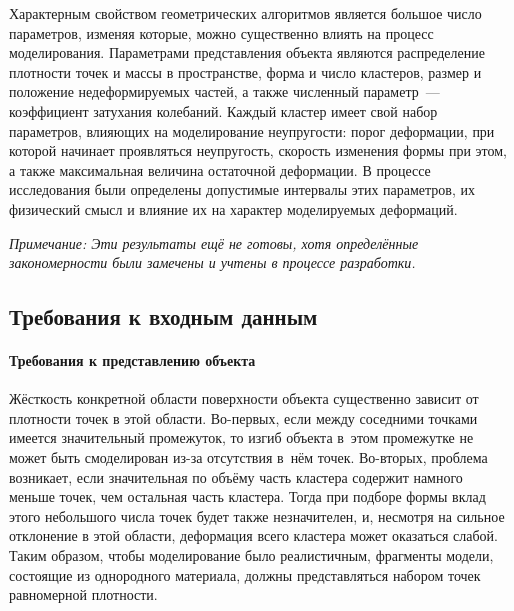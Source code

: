 \documentclass[a4paper, 14pt, titlepage]{extarticle}
\newcommand{\note}[1]{\textit{Примечание: #1}}
\begin{document}
      Характерным свойством геометрических алгоритмов является большое число параметров, изменяя
      которые, можно существенно влиять на процесс моделирования.
      Параметрами представления объекта являются распределение плотности точек и массы в
      пространстве, форма и число кластеров, размер и положение недеформируемых частей, а также
      численный параметр~--- коэффициент затухания колебаний. Каждый кластер имеет свой набор
      параметров, влияющих на моделирование неупругости: порог деформации, при которой начинает
      проявляться неупругость, скорость изменения формы при этом, а также максимальная величина
      остаточной деформации. В процессе исследования были определены
      допустимые интервалы этих параметров, их физический смысл и влияние их на характер
      моделируемых деформаций.


      \note{Эти результаты ещё не готовы, хотя определённые закономерности были замечены и учтены в
      процессе разработки.}



    \subsection{Требования к входным данным}\label{ssec:requirements}

      \paragraph{Требования к представлению объекта}
      Жёсткость конкретной области поверхности объекта существенно зависит от плотности точек в этой
      области. Во-первых, если между соседними точками имеется значительный промежуток, то изгиб
      объекта в~этом промежутке не может быть смоделирован из-за отсутствия в~нём точек. Во-вторых,
      проблема возникает, если значительная по объёму часть кластера содержит намного меньше точек,
      чем остальная часть кластера. Тогда при подборе формы вклад этого небольшого числа точек будет
      также незначителен, и, несмотря на сильное отклонение в этой области, деформация всего
      кластера может оказаться слабой. Таким образом, чтобы моделирование было реалистичным,
      фрагменты модели, состоящие из однородного материала, должны представляться набором точек
      равномерной плотности.
\end{document}
